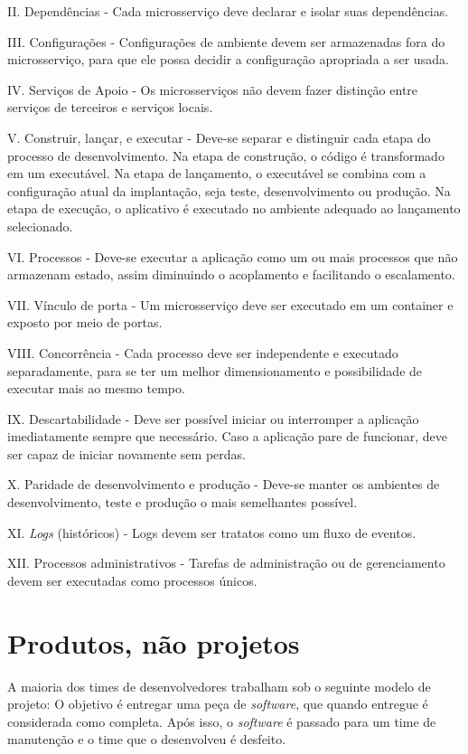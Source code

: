 II. Dependências - Cada microsserviço deve declarar e isolar suas dependências.

III. Configurações - Configurações de ambiente devem ser armazenadas fora do microsserviço, para que ele possa decidir a configuração apropriada a ser usada.

IV. Serviços de Apoio - Os microsserviços não devem fazer distinção entre serviços de terceiros e serviços locais.

V. Construir, lançar, e executar - Deve-se separar e distinguir cada etapa do processo de desenvolvimento. Na etapa de construção, o código é transformado em um executável. Na etapa de lançamento, o executável se combina com a configuração atual da implantação, seja teste, desenvolvimento ou produção. Na etapa de execução, o aplicativo é executado no ambiente adequado ao lançamento selecionado.

VI. Processos - Deve-se executar a aplicação como um ou mais processos que não armazenam estado, assim diminuindo o acoplamento e facilitando o escalamento.

VII. Vínculo de porta - Um microsserviço deve ser executado em um container e exposto por meio de portas.

VIII. Concorrência - Cada processo deve ser independente e executado separadamente, para se ter um melhor dimensionamento e possibilidade de executar mais ao mesmo tempo.

IX. Descartabilidade - Deve ser possível iniciar ou interromper a aplicação imediatamente sempre que necessário. Caso a aplicação pare de funcionar, deve ser capaz de iniciar novamente sem perdas.

X. Paridade de desenvolvimento e produção - Deve-se manter os ambientes de desenvolvimento, teste e produção o mais semelhantes possível.

XI. \emph{Logs} (históricos) - Logs devem ser tratatos como um fluxo de eventos.

XII. Processos administrativos - Tarefas de administração ou de gerenciamento devem ser executadas como processos únicos. \cite{12factor, oracle_microservices,12fatores-rita}

\section{Produtos, não projetos}

A maioria dos times de desenvolvedores trabalham sob o seguinte modelo de projeto: O objetivo é entregar uma peça de \emph{software}, que quando entregue é considerada como completa. Após isso, o \emph{software} é passado para um time de manutenção e o time que o desenvolveu é desfeito. \cite{MartinFowlerMicroservices}

